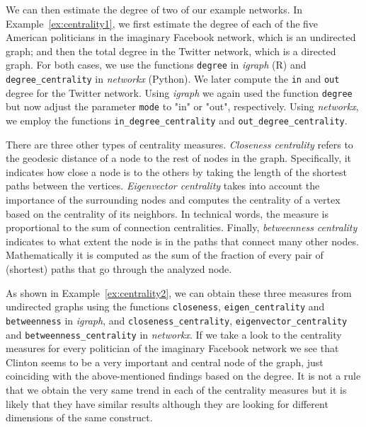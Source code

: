 We can then estimate the degree of two of our example networks. In Example~\ref{ex:centrality1}, we first estimate the degree of each of the five American politicians in the imaginary Facebook network, which is an undirected graph; and then the total degree in the Twitter network, which is a directed graph. For both cases, we use the functions \texttt{degree} in \emph{igraph} (R) and \texttt{degree\_centrality} in \emph{networkx} (Python). We later compute the \texttt{in} and \texttt{out} degree for the Twitter network. Using \emph{igraph} we again used the function \texttt{degree} but now adjust the parameter \texttt{mode} to "in" or "out", respectively. Using \emph{networkx}, we employ the functions \texttt{in\_degree\_centrality} and \texttt{out\_degree\_centrality}.


There are three other types of centrality measures. \emph{Closeness centrality} refers to the geodesic distance of a node to the rest of nodes in the graph. Specifically, it indicates how close a node is to the others by taking the length of the shortest paths between the vertices. \emph{Eigenvector centrality} takes into account the importance of the surrounding nodes and computes the centrality of a vertex based on the centrality of its neighbors. In technical words, the measure is proportional to the sum of connection centralities. Finally, \emph{betweenness centrality} indicates to what extent the node is in the paths that connect many other nodes. Mathematically it is computed as the sum of the fraction of every pair of (shortest) paths that go through the analyzed node.

As shown in Example~\ref{ex:centrality2}, we can obtain these three measures from undirected graphs using the functions \texttt{closeness}, \texttt{eigen\_centrality} and \texttt{betweenness} in \emph{igraph}, and \texttt{closeness\_centrality}, \texttt{eigenvector\_centrality} and \texttt{betweenness\_centrality} in \emph{networkx}. If we take a look to the centrality measures for every politician of the imaginary Facebook network we see that Clinton seems to be a very important and central node of the graph, just coinciding with the above-mentioned findings based on the degree. It is not a rule that we obtain the very same trend in each of the centrality measures but it is likely that they have similar results although they are looking for different dimensions of the same construct.

